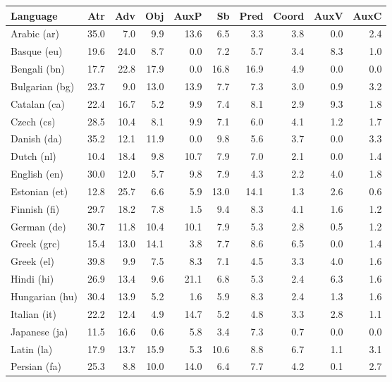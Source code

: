 {\footnotesize
\setlength{\tabcolsep}{4pt}
\begin{longtable}{|l|r|r|r|r|r|r|r|r|r|}
 \hline 
Language & Atr & Adv & Obj & AuxP & Sb & Pred & Coord & AuxV & AuxC\\ \hline \hline 
Arabic (ar) &  35.0 & 7.0 & 9.9 & 13.6 & 6.5 & 3.3 & 3.8 & 0.0 & 2.4\\ \hline
Basque (eu) &  19.6 & 24.0 & 8.7 & 0.0 & 7.2 & 5.7 & 3.4 & 8.3 & 1.0\\ \hline
Bengali (bn) &  17.7 & 22.8 & 17.9 & 0.0 & 16.8 & 16.9 & 4.9 & 0.0 & 0.0\\ \hline
Bulgarian (bg) &  23.7 & 9.0 & 13.0 & 13.9 & 7.7 & 7.3 & 3.0 & 0.9 & 3.2\\ \hline
Catalan (ca) &  22.4 & 16.7 & 5.2 & 9.9 & 7.4 & 8.1 & 2.9 & 9.3 & 1.8\\ \hline
Czech (cs) &  28.5 & 10.4 & 8.1 & 9.9 & 7.1 & 6.0 & 4.1 & 1.2 & 1.7\\ \hline
Danish (da) &  35.2 & 12.1 & 11.9 & 0.0 & 9.8 & 5.6 & 3.7 & 0.0 & 3.3\\ \hline
Dutch (nl) &  10.4 & 18.4 & 9.8 & 10.7 & 7.9 & 7.0 & 2.1 & 0.0 & 1.4\\ \hline
English (en) &  30.0 & 12.0 & 5.7 & 9.8 & 7.9 & 4.3 & 2.2 & 4.0 & 1.8\\ \hline
Estonian (et) &  12.8 & 25.7 & 6.6 & 5.9 & 13.0 & 14.1 & 1.3 & 2.6 & 0.6\\ \hline
Finnish (fi) &  29.7 & 18.2 & 7.8 & 1.5 & 9.4 & 8.3 & 4.1 & 1.6 & 1.2\\ \hline
German (de) &  30.7 & 11.8 & 10.4 & 10.1 & 7.9 & 5.3 & 2.8 & 0.5 & 1.2\\ \hline
Greek (grc) &  15.4 & 13.0 & 14.1 & 3.8 & 7.7 & 8.6 & 6.5 & 0.0 & 1.4\\ \hline
Greek (el) &  39.8 & 9.9 & 7.5 & 8.3 & 7.1 & 4.5 & 3.3 & 4.0 & 1.6\\ \hline
Hindi (hi) &  26.9 & 13.4 & 9.6 & 21.1 & 6.8 & 5.3 & 2.4 & 6.3 & 1.6\\ \hline
Hungarian (hu) &  30.4 & 13.9 & 5.2 & 1.6 & 5.9 & 8.3 & 2.4 & 1.3 & 1.6\\ \hline
Italian (it) &  22.2 & 12.4 & 4.9 & 14.7 & 5.2 & 4.8 & 3.3 & 2.8 & 1.1\\ \hline
Japanese (ja) &  11.5 & 16.6 & 0.6 & 5.8 & 3.4 & 7.3 & 0.7 & 0.0 & 0.0\\ \hline
Latin (la) &  17.9 & 13.7 & 15.9 & 5.3 & 10.6 & 8.8 & 6.7 & 1.1 & 3.1\\ \hline
Persian (fa) &  25.3 & 8.8 & 10.0 & 14.0 & 6.4 & 7.7 & 4.2 & 0.1 & 2.7\\ \hline

\end{longtable}}

